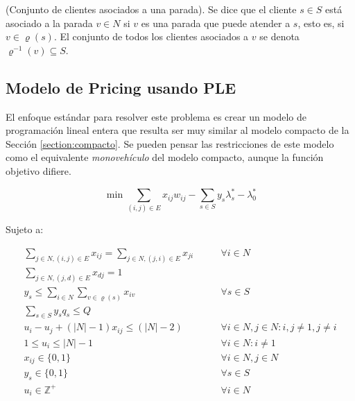 \begin{definition}
    (Conjunto de clientes asociados a una parada).
    Se dice que el cliente $s \in S$ está asociado a la parada $v \in N$ si $v$ es una parada que puede atender a $s$, esto es, si $v \in \varrho(s)$. El conjunto de todos los clientes asociados a $v$ se denota $\varrho^{-1}(v) \subseteq S$.
\end{definition}

\subsection{Modelo de Pricing usando PLE}
\label{section:pricing-ple}

El enfoque estándar para resolver este problema es crear un modelo de programación lineal entera que resulta ser muy similar al modelo compacto de la Sección \ref{section:compacto}. Se pueden pensar las restricciones de este modelo como el equivalente \emph{monovehículo} del modelo compacto, aunque la función objetivo difiere. 

\begin{equation}
\min \sum_{(i, j) \in E} {x_{ij} w_{ij}} - \sum_{s \in S} {y_{s} \lambda^*_s - \lambda^*_0}
\end{equation}

Sujeto a:

\begin{align}
    \sum_{j \in N, (i, j) \in E}{x_{ij}} = \sum_{j \in N, (j, i) \in E}{x_{ji}} \qquad & \forall {i \in N} \label{eq:pricing1} \\
    \sum_{j \in N, (j, d) \in E}{x_{dj}} = 1 & \label{eq:pricing2} \\
    y_{s} \leq \sum_{i \in N}\sum_{v \in \varrho(s)}{x_{iv}} \qquad & \forall {s \in S} \label{eq:pricing3} \\
    \sum_{s \in S}{y_{s}q_s} \le Q & \label{eq:pricing4} \\
    u_{i} - u_{j} + (|N| - 1)x_{ij} \leq (|N| - 2) \qquad & \forall {i \in N, j \in N : i, j \neq 1, j \neq i}  \label{eq:pricing5} \\
    1 \leq u_{i} \leq |N| - 1 \qquad & \forall {i \in N : i \neq 1} \label{eq:pricing6} \\
    x_{ij} \in \{0, 1\} \qquad & \forall {i \in N, j \in N} \label{eq:pricing7} \\
y_{s} \in \{0, 1\} \qquad & \forall {s \in S} \label{eq:pricing8}\\
u_{i} \in \mathbb{Z}^{+} \qquad & \forall {i \in N} \label{eq:pricing9}
\end{align}

